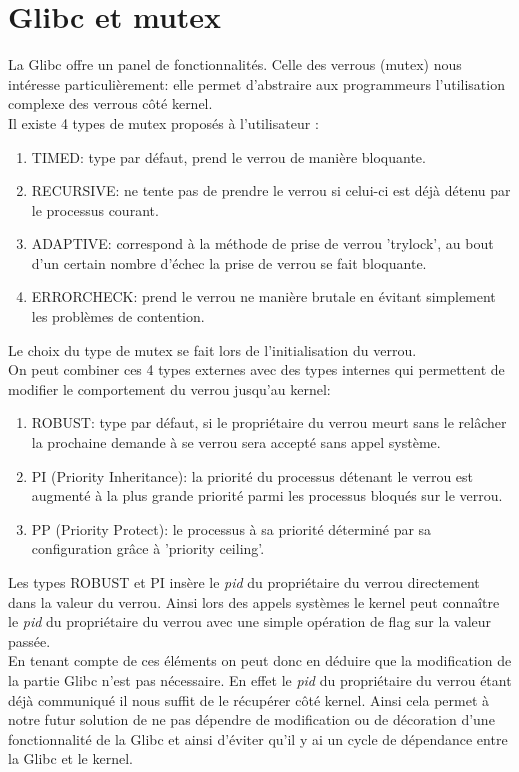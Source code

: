 \section*{Glibc et mutex}
La Glibc offre un panel de fonctionnalités. 
Celle des verrous (mutex) nous intéresse particulièrement: elle permet 
d'abstraire aux programmeurs l'utilisation complexe des verrous côté kernel.
\\

Il existe 4 types de mutex proposés à l'utilisateur :
\begin{enumerate}
	\item TIMED: type par défaut, prend le verrou de manière bloquante.
	\item RECURSIVE: ne tente pas de prendre le verrou si celui-ci est
	déjà détenu par le processus courant.
	\item ADAPTIVE: correspond à la méthode de prise de verrou 'trylock',
	au bout d'un certain nombre d'échec la prise de verrou se fait
	bloquante.
	\item ERRORCHECK: prend le verrou ne manière brutale en évitant
	simplement les problèmes de contention.
\end{enumerate}
Le choix du type de mutex se fait lors de l'initialisation du verrou.
\\
On peut combiner ces 4 types externes avec des types internes qui permettent de
modifier le comportement du verrou jusqu'au kernel:

\begin{enumerate}
	\item ROBUST: type par défaut, si le propriétaire du verrou meurt sans
	le relâcher la prochaine demande à se verrou sera accepté sans appel
	système.
	\item PI (Priority Inheritance): la priorité du processus détenant le
	verrou est augmenté à la plus grande priorité parmi les processus
	bloqués sur le verrou.
	\item PP (Priority Protect): le processus à sa priorité déterminé par
	sa configuration grâce à 'priority ceiling'.
\end{enumerate}
Les types ROBUST et PI insère le \textit{pid} du propriétaire du verrou
directement dans la valeur du verrou. Ainsi lors des appels systèmes le kernel
peut connaître le \textit{pid} du propriétaire du verrou avec une simple
opération de flag sur la valeur passée.
\\

En tenant compte de ces éléments on peut donc en déduire que la modification 
de la partie Glibc n'est pas nécessaire. En effet le \textit{pid} du 
propriétaire du verrou étant déjà communiqué il nous suffit de le récupérer 
côté kernel. Ainsi cela permet à notre futur solution de ne pas dépendre de 
modification ou de décoration d'une fonctionnalité de la Glibc et ainsi d'éviter 
qu'il y ai un cycle de dépendance entre la Glibc et le kernel.